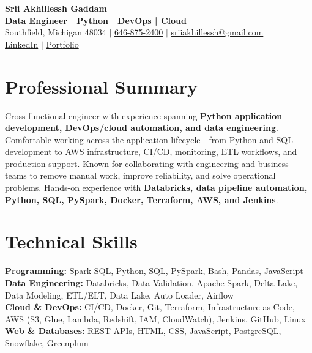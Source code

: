 \documentclass[letterpaper,10pt]{article}
\begin{document}
\fontsize{9.35pt}{10.45pt}\selectfont

\begin{center}
    {\LARGE \textbf{Srii Akhillessh Gaddam}} \\[-1pt]
    \textbf{Data Engineer | Python | DevOps | Cloud} \\[2pt]
    Southfield, Michigan 48034 $|$
    \href{tel:6468752400}{646-875-2400} $|$
    \href{mailto:sriiakhillessh@gmail.com}{sriiakhillessh@gmail.com} \\[1pt]
    \href{https://www.linkedin.com/in/srii-akhiilessh-gaddam-b48668191/}{LinkedIn} $|$
    \href{https://sriiakhillesshg.github.io/portfolio/}{Portfolio}
\end{center}
\vspace{-8pt}

\section{Professional Summary}
\small{Cross-functional engineer with experience spanning \textbf{Python application development, DevOps/cloud automation, and data engineering}. Comfortable working across the application lifecycle - from Python and SQL development to AWS infrastructure, CI/CD, monitoring, ETL workflows, and production support. Known for collaborating with engineering and business teams to remove manual work, improve reliability, and solve operational problems. Hands-on experience with \textbf{Databricks, data pipeline automation, Python, SQL, PySpark, Docker, Terraform, AWS, and Jenkins}.}

\section{Technical Skills}
\small{
\textbf{Programming:} Spark SQL, Python, SQL, PySpark, Bash, Pandas, JavaScript \\
\textbf{Data Engineering:} Databricks, Data Validation, Apache Spark, Delta Lake, Data Modeling, ETL/ELT, Data Lake, Auto Loader, Airflow \\
\textbf{Cloud \& DevOps:} CI/CD, Docker, Git, Terraform, Infrastructure as Code, AWS (S3, Glue, Lambda, Redshift, IAM, CloudWatch), Jenkins, GitHub, Linux \\
\textbf{Web \& Databases:} REST APIs, HTML, CSS, JavaScript, PostgreSQL, Snowflake, Greenplum
}
\end{document}

